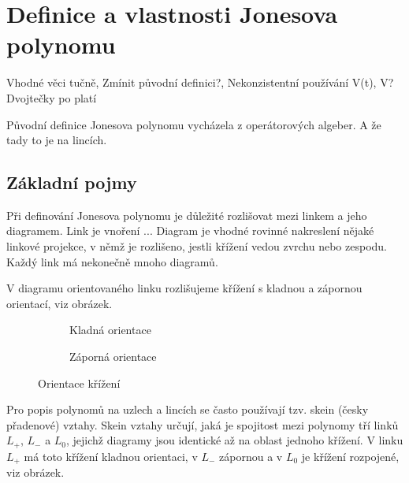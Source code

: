 
\chapter{Definice a vlastnosti Jonesova polynomu}

Vhodné věci tučně, Zmínit původní definici?, Nekonzistentní používání V(t), V? Dvojtečky po platí

Původní definice Jonesova polynomu vycházela z operátorových algeber. A že tady to je na lincích.
\section{Základní pojmy}

Při definování Jonesova polynomu je důležité rozlišovat mezi linkem a jeho diagramem. Link je vnoření ... Diagram je vhodné rovinné nakreslení nějaké linkové projekce, v němž je rozlišeno, jestli křížení vedou zvrchu nebo zespodu. Každý link má nekonečně mnoho diagramů.

V diagramu orientovaného linku rozlišujeme křížení s kladnou a zápornou orientací, viz obrázek.

\begin{figure}[h]  
\centering 
\begin{subfigure}[t]{0.4\linewidth}\centering
{} 
\caption{Kladná orientace} \label{fig:M1}  
\end{subfigure}
\begin{subfigure}[t]{0.4\linewidth}\centering
{}  
\caption{Záporná orientace} \label{fig:M2}  
\end{subfigure}
\caption{Orientace křížení}
\end{figure}  

Pro popis polynomů na uzlech a lincích se často používají tzv. skein (česky přadenové) vztahy.
Skein vztahy určují, jaká je spojitost mezi polynomy tří linků $L_+$, $ L_-$ a $L_0$, jejichž diagramy jsou identické až na oblast jednoho křížení. V linku $L_+$ má toto křížení kladnou orientaci, v $L_-$ zápornou a v $L_0$ je křížení rozpojené, viz obrázek.

